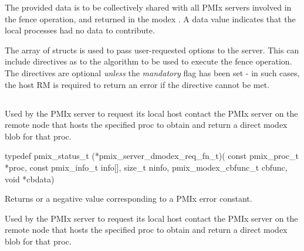 The provided data is to be collectively shared with all PMIx servers involved in the fence operation, and returned in the modex .
A  data value indicates that the local processes had no data to contribute.

The array of  structs is used to pass user-requested options to the server.
This can include directives as to the algorithm to be used to execute the fence operation.
The directives are optional \emph{unless} the \emph{mandatory} flag has been set - in such cases, the host \ac{RM} is required to return an error if the directive cannot be met.


\subsection{}

\summary

Used by the PMIx server to request its local host contact the PMIx server on the remote node that hosts the specified proc to obtain and return a direct modex blob for that proc.

\format

\cspecificstart
\begin{codepar}
typedef pmix_status_t (*pmix_server_dmodex_req_fn_t)(
                             const pmix_proc_t *proc,
                             const pmix_info_t info[], size_t ninfo,
                             pmix_modex_cbfunc_t cbfunc, void *cbdata)
\end{codepar}
\cspecificend

\begin{arglist}
\end{arglist}

Returns  or a negative value corresponding to a PMIx error constant.

\descr

Used by the PMIx server to request its local host contact the PMIx server on the remote node that hosts the specified proc to obtain and return a direct modex blob for that proc.

